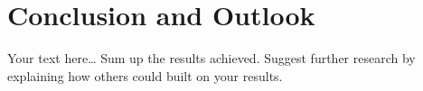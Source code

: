 \chapter{Conclusion and Outlook}
\label{chap:conclusion}
\chapterstart

Your text here\ldots
Sum up the results achieved. Suggest further research by explaining how others could built on your results.

\chapterend



%
